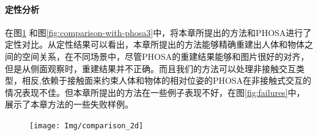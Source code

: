 

\paragraph{定性分析}
在图\ref{fig:comparison-with-phosa}%
和图\ref{fig:comparison-with-phosa3}中，将本章所提出的方法和PHOSA进行了定性对比。从定性结果可以看出，本章所提出的方法能够精确重建出人体和物体之间的空间关系，在不同场景中，尽管PHOSA的重建结果能够和图片很好的对齐，但是从侧面观察时，重建结果并不正确。而且我们的方法可以处理非接触交互类型，相反,依赖于接触面来约束人体和物体的相对位姿的PHOSA在非接触式交互的情况表现不佳。但本章所提出的方法在一些例子表现不好，在图\ref{fig:failures}中，展示了本章方法的一些失败样例。

\begin{figure}[!htbp]
	\centering
	\texttt{[image: Img/comparison\_2d]}
	\label{fig:comparison-with-phosa}
\end{figure}


